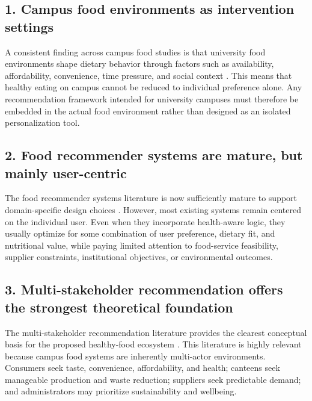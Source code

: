 \documentclass[journal]{IEEEtran}
\begin{document}
\subsection{1. Campus food environments as intervention
settings}\label{campus-food-environments-as-intervention-settings}

A consistent finding across campus food studies is that university food
environments shape dietary behavior through factors such as
availability, affordability, convenience, time pressure, and social
context
\cite{roy2015tertiary, deliens2014determinants, caruso2025campus}. This
means that healthy eating on campus cannot be reduced to individual
preference alone. Any recommendation framework intended for university
campuses must therefore be embedded in the actual food environment
rather than designed as an isolated personalization tool.

\subsection{2. Food recommender systems are mature, but mainly
user-centric}\label{food-recommender-systems-are-mature-but-mainly-user-centric}

The food recommender systems literature is now sufficiently mature to
support domain-specific design choices
\cite{bondevik2024, tran2018healthy, trattner2017food}. However, most
existing systems remain centered on the individual user. Even when they
incorporate health-aware logic, they usually optimize for some
combination of user preference, dietary fit, and nutritional value,
while paying limited attention to food-service feasibility, supplier
constraints, institutional objectives, or environmental outcomes.

\subsection{3. Multi-stakeholder recommendation offers the strongest
theoretical
foundation}\label{multi-stakeholder-recommendation-offers-the-strongest-theoretical-foundation}

The multi-stakeholder recommendation literature provides the clearest
conceptual basis for the proposed healthy-food ecosystem
\cite{zheng2017msr, abdollahpouri2019fairness, wu2021multifr}. This
literature is highly relevant because campus food systems are inherently
multi-actor environments. Consumers seek taste, convenience,
affordability, and health; canteens seek manageable production and waste
reduction; suppliers seek predictable demand; and administrators may
prioritize sustainability and wellbeing.
\end{document}
